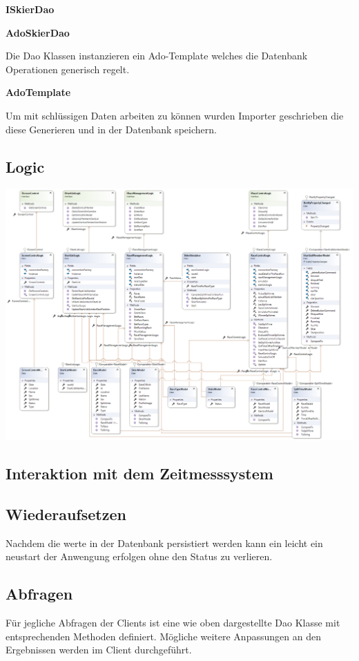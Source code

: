 \documentclass[a4paper, 12pt]{article}
\begin{document}
	\textbf{ISkierDao}
	
	\textbf{AdoSkierDao}
	
	
	Die Dao Klassen instanzieren ein Ado-Template welches die Datenbank Operationen generisch regelt.
	
	\textbf{AdoTemplate}
	
	
	Um mit schlüssigen Daten arbeiten zu können wurden Importer geschrieben die diese Generieren und in der Datenbank speichern.
	
	\subsection{Logic}
	\includegraphics[width=.9\textwidth]{img/Logic.png}\\
	\subsection{Interaktion mit dem Zeitmesssystem}
	
	\subsection{Wiederaufsetzen}
	Nachdem die werte in der Datenbank persistiert werden kann ein leicht ein neustart der Anwengung erfolgen ohne den Status zu verlieren.
	
	\subsection{Abfragen}
	Für jegliche Abfragen der Clients ist eine wie oben dargestellte Dao Klasse mit entsprechenden Methoden definiert. Mögliche weitere Anpassungen an den Ergebnissen werden im Client durchgeführt.
	
\end{document}
